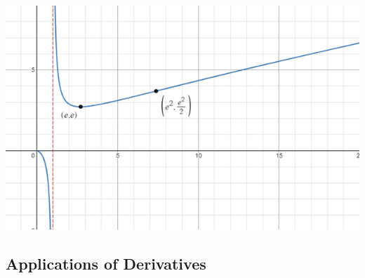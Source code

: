 \documentclass[11pt, fleqn]{article}
\begin{document}
\centerline{\includegraphics[scale=0.9]{DifferentialCalculusPictures/SketchingEx1.png}}







\subsection{Applications of Derivatives}
\end{document}
